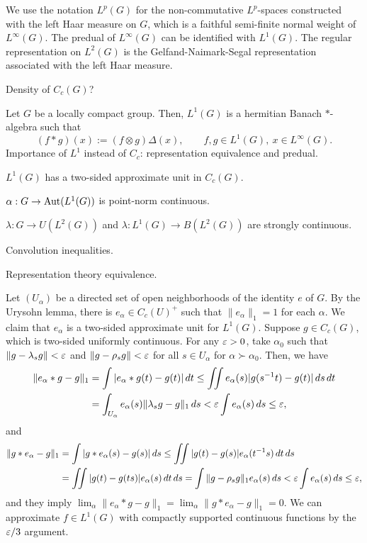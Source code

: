 \documentclass{../../large}
\begin{document}
We use the notation $L^p(G)$ for the non-commutative $L^p$-spaces constructed with the left Haar measure on $G$, which is a faithful semi-finite normal weight of $L^\infty(G)$.
The predual of $L^\infty(G)$ can be identified with $L^1(G)$.
The regular representation on $L^2(G)$ is the Gelfand-Naimark-Segal representation associated with the left Haar measure.

Density of $C_c(G)$?

\begin{prb}
Let $G$ be a locally compact group.
Then, $L^1(G)$ is a hermitian Banach $*$-algebra such that
\[(f*g)(x):=(f\otimes g)\Delta(x),\qquad f,g\in L^1(G),\ x\in L^\infty(G).\]
Importance of $L^1$ instead of $C_c$: representation equivalence and predual.
\begin{parts}
\item $L^1(G)$ has a two-sided approximate unit in $C_c(G)$.
\item $\alpha:G\to\operatorname{Aut}(L^1(G))$ is point-norm continuous.
\item $\lambda:G\to U(L^2(G))$ and $\lambda:L^1(G)\to B(L^2(G))$ are strongly continuous.
\item Convolution inequalities.
\item Representation theory equivalence.
\end{parts}
\begin{pf}
Let $(U_\alpha)$ be a directed set of open neighborhoods of the identity $e$ of $G$.
By the Urysohn lemma, there is $e_\alpha\in C_c(U)^+$ such that $\|e_\alpha\|_1=1$ for each $\alpha$.
We claim that $e_\alpha$ is a two-sided approximate unit for $L^1(G)$.
Suppose $g\in C_c(G)$, which is two-sided uniformly continuous.
For any $\varepsilon>0$, take $\alpha_0$ such that $\|g-\lambda_sg\|<\varepsilon$ and $\|g-\rho_sg\|<\varepsilon$ for all $s\in U_\alpha$ for $\alpha\succ\alpha_0$.
Then, we have
\begin{align*}
\|e_\alpha*g-g\|_1
&=\int|e_\alpha*g(t)-g(t)|\,dt\le\iint e_\alpha(s)|g(s^{-1}t)-g(t)|\,ds\,dt\\
&=\int_{U_\alpha}e_\alpha(s)\|\lambda_sg-g\|_1\,ds<\varepsilon\int e_\alpha(s)\,ds\le\varepsilon,
\end{align*}
and
\begin{align*}
\|g*e_\alpha-g\|_1
&=\int|g*e_\alpha(s)-g(s)|\,ds\le\iint|g(t)-g(s)|e_\alpha(t^{-1}s)\,dt\,ds\\
&=\iint|g(t)-g(ts)|e_\alpha(s)\,dt\,ds=\int\|g-\rho_sg\|_1e_\alpha(s)\,ds<\varepsilon\int e_\alpha(s)\,ds\le\varepsilon,
\end{align*}
and they imply $\lim_\alpha\|e_\alpha*g-g\|_1=\lim_\alpha\|g*e_\alpha-g\|_1=0$.
We can approximate $f\in L^1(G)$ with compactly supported continuous functions by the $\varepsilon/3$ argument.
\end{pf}

\end{prb}
\end{document}
